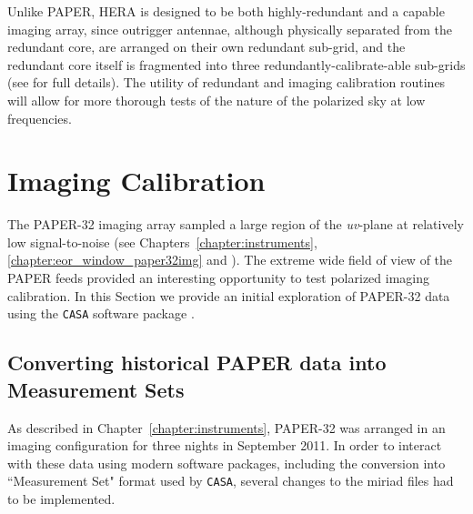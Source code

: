 Unlike PAPER, HERA is designed to be both highly-redundant and a capable imaging array, since outrigger antennae, although physically separated from the redundant core, are arranged on their own redundant sub-grid, and the redundant core itself is fragmented into three redundantly-calibrate-able sub-grids (see \citealt{Dillon.16} for full details). The utility of redundant and imaging calibration routines will allow for more thorough tests of the nature of the polarized sky at low frequencies.

\section{Imaging Calibration}
\label{sec:polcal_imagecal}

The PAPER-32 imaging array sampled a large region of the \textit{uv}-plane at relatively low signal-to-noise (see Chapters~\ref{chapter:instruments}, \ref{chapter:eor_window_paper32img} and \citet{Kohn.16}). The extreme wide field of view of the PAPER feeds provided an interesting opportunity to test polarized imaging calibration. In this Section we provide an initial exploration of PAPER-32 data using the {\tt CASA} software package \citep{casa}.

\subsection{Converting historical PAPER data into Measurement Sets}

As described in Chapter~\ref{chapter:instruments}, PAPER-32 was arranged in an imaging configuration for three nights in September 2011. In order to interact with these data using modern software packages, including the conversion into ``Measurement Set" format used by {\tt CASA}, several changes to the {\sc miriad} files had to be implemented.

